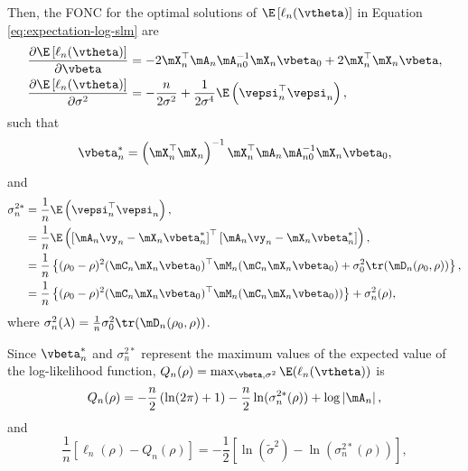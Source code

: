 \documentclass[english,12pt]{book}\usepackage[]{graphicx}\usepackage[]{xcolor}
\begin{document}
\begin{subappendices}
Then, the FONC for the optimal solutions of $\E\left[\ell_n(\vtheta)\right]$ in Equation \eqref{eq:expectation-log-slm} are
\begin{equation*}
\begin{aligned}
\frac{\partial  \E\left[\ell_n(\vtheta)\right]}{\partial \vbeta} & = -2\mX_n^\top\mA_n\mA_{n0}^{-1}\mX_n\vbeta_0 +  2\mX_n^\top\mX_n\vbeta, \\
\frac{\partial  \E\left[\ell_n(\vtheta)\right]}{\partial \sigma^2} & = -\frac{n}{2\sigma^2} + \frac{1}{2\sigma^4}\E\left(\vepsi_n^\top\vepsi_n\right), 
\end{aligned}
\end{equation*}
%
such that
\begin{equation*}
\vbeta_n^*  = \left(\mX_n^\top\mX_n\right)^{-1}\mX_n^\top\mA_n\mA_{n0}^{-1}\mX_n\vbeta_0,
\end{equation*}
and 
\begin{equation}\label{eq:sigma-star-consistency}
\begin{aligned}
\sigma^{2*}_n  &  = \frac{1}{n}\E\left(\vepsi_n^\top\vepsi_n\right), \\
               & =  \frac{1}{n}\E\left(\left[\mA_n\vy_n - \mX_n\vbeta_n^*\right]^\top \left[\mA_n\vy_n - \mX_n\vbeta_n^*\right]\right), \\
               &= \frac{1}{n}\left\lbrace (\rho_0 - \rho)^2(\mC_n\mX_n\vbeta_0)^\top \mM_n(\mC_n\mX_n\vbeta_0) + \sigma_0^2\tr(\mD_n(\rho_0, \rho)) \right\rbrace, \\
               & = \frac{1}{n}\left\lbrace (\rho_0 - \rho)^2(\mC_n\mX_n\vbeta_0)^\top \mM_n(\mC_n\mX_n\vbeta_0))\right\rbrace + \sigma_n^2(\rho), 
\end{aligned}
\end{equation}
%
where $\sigma_n^2(\lambda) = \frac{1}{n}\sigma_0^2\tr(\mD_n(\rho_0, \rho))$.

Since $\vbeta^*_n$ and $\sigma_n^{2*}$ represent the maximum values of the expected value of the log-likelihood function, $Q_n(\rho) = \max_{\vbeta, \sigma^2}\E(\ell_n(\vtheta))$ is 
\begin{equation*}
  Q_n(\rho) = -\frac{n}{2}\left(\ln(2\pi) + 1\right) - \frac{n}{2}\ln(\sigma^{2*}_n(\rho)) + \log\left|\mA_n\right|,
\end{equation*}
%
and
\begin{equation*}
\frac{1}{n}\left[\ell_n(\rho) - Q_n(\rho)\right] = -\frac{1}{2}\left[\ln( \widetilde{\sigma}^{2}) - \ln(\sigma^{2*}_n(\rho)) \right],
\end{equation*}


\end{subappendices}
\end{document}
